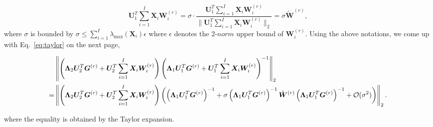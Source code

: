 \documentclass[10pt,journal]{IEEEtran}
\newcommand{\G}{\boldsymbol{G}}
\newcommand{\X}{\boldsymbol{X}}
\newcommand{\U}{\boldsymbol{U}}
\begin{document}
\begin{equation}
   \U_1^T\sum_{i=1}^I \X_i{\bm W}_i^{(r)} = \sigma\cdot  \frac{\U_1^T  \sum_{i=1}^I \X_i{\bm W}_i^{(r)}}{\|\U_1^T \sum_{i=1}^I \X_i{\bm W}_i^{(r)}\|_2}=\sigma\tilde{\bm W}^{(r)},    
\end{equation}
where $\sigma$ is bounded by $\sigma \leq \sum_{i=1}^I\lambda_{\max}(\X_i)\epsilon$
where $\epsilon$ denotes the $2$-$norm$ upper bound of ${\bm W}_i^{(r)}$.
Using the above notations, we come up with Eq.~\eqref{eq:taylor} on the next page,
\begin{figure}[t]
\begin{align}\label{eq:taylor}
&\left\|\left(\bm \Lambda_2 \U_2^T\G^{(r)} + \U_2^T  \sum_{i=1}^I \X_i{\bm W}_i^{(r)} \right)\left(\bm \Lambda_1 \U_1^T\G^{(r)} + \U_1^T \sum_{i=1}^I \X_i{\bm W}_i^{(r)}  \right)^{-1}\right\|_2 \nonumber\\
= &\left\|\left(\bm \Lambda_2 \U_2^T\G^{(r)} + \U_2^T  \sum_{i=1}^I \X_i{\bm W}_i^{(r)} \right)\left(  \left(\bm \Lambda_1 \U_1^T\G^{(r)}\right)^{-1} + \sigma \left(\bm \Lambda_1 \U_1^T\G^{(r)}\right)^{-1} \tilde{\bm W}^{(r)}\left(\bm \Lambda_1 \U_1^T\G^{(r)}\right)^{-1} + {\cal O}(\sigma^2) \right)\right\|_2.
\end{align}
\hrulefill
\end{figure}
where the equality is obtained by the Taylor expansion.
\end{document}
